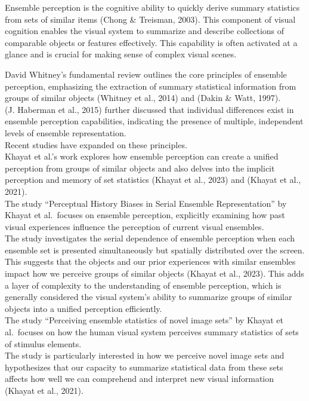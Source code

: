 \documentclass[print]{nuthesis}
\begin{document}
Ensemble perception is the cognitive ability to quickly derive summary statistics from sets of similar items (Chong \& Treisman, 2003).
This component of visual cognition enables the visual system to summarize and describe collections of comparable objects or features effectively.
This capability is often activated at a glance and is crucial for making sense of complex visual scenes.

David Whitney's fundamental review outlines the core principles of ensemble perception, emphasizing the extraction of summary statistical information from groups of similar objects (Whitney et al., 2014) and (Dakin \& Watt, 1997).\\
(J. Haberman et al., 2015) further discussed that individual differences exist in ensemble perception capabilities, indicating the presence of multiple, independent levels of ensemble representation.\\
Recent studies have expanded on these principles.\\
Khayat et al.'s work explores how ensemble perception can create a unified perception from groups of similar objects and also delves into the implicit perception and memory of set statistics (Khayat et al., 2023) and (Khayat et al., 2021).\\
The study ``Perceptual History Biases in Serial Ensemble Representation'' by Khayat et al.~focuses on ensemble perception, explicitly examining how past visual experiences influence the perception of current visual ensembles.\\
The study investigates the serial dependence of ensemble perception when each ensemble set is presented simultaneously but spatially distributed over the screen.\\
This suggests that the objects and our prior experiences with similar ensembles impact how we perceive groups of similar objects (Khayat et al., 2023).
This adds a layer of complexity to the understanding of ensemble perception, which is generally considered the visual system's ability to summarize groups of similar objects into a unified perception efficiently.\\
The study ``Perceiving ensemble statistics of novel image sets'' by Khayat et al.~focuses on how the human visual system perceives summary statistics of sets of stimulus elements.\\
The study is particularly interested in how we perceive novel image sets and hypothesizes that our capacity to summarize statistical data from these sets affects how well we can comprehend and interpret new visual information (Khayat et al., 2021).
\end{document}
